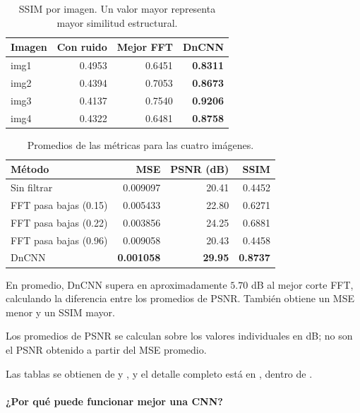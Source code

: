 \documentclass[11pt]{article}
\begin{document}
\begin{table}[H]
\centering

\caption{
    SSIM por imagen. Un valor mayor representa mayor
    similitud estructural.
}
\label{tab:cnn-ssim}

\begin{tabular}{lrrr}
\hline
\rowcolor{pastelblue}
Imagen & Con ruido & Mejor FFT & DnCNN\\
\hline
img1 & 0.4953 & 0.6451 & \textbf{0.8311}\\
img2 & 0.4394 & 0.7053 & \textbf{0.8673}\\
img3 & 0.4137 & 0.7540 & \textbf{0.9206}\\
img4 & 0.4322 & 0.6481 & \textbf{0.8758}\\
\hline
\end{tabular}
\end{table}

\begin{table}[H]
\centering

\caption{Promedios de las métricas para las cuatro imágenes.}
\label{tab:cnn-promedios}

\begin{tabular}{lrrr}
\hline
\rowcolor{pastelblue}
Método & MSE & PSNR (dB) & SSIM\\
\hline
Sin filtrar
    & 0.009097 & 20.41 & 0.4452\\
FFT pasa bajas (0.15)
    & 0.005433 & 22.80 & 0.6271\\
FFT pasa bajas (0.22)
    & 0.003856 & 24.25 & 0.6881\\
FFT pasa bajas (0.96)
    & 0.009058 & 20.43 & 0.4458\\
DnCNN
    & \textbf{0.001058}
    & \textbf{29.95}
    & \textbf{0.8737}\\
\hline
\end{tabular}
\end{table}

En promedio, DnCNN supera en aproximadamente $5.70$ dB al
mejor corte FFT, calculando la diferencia entre los
promedios de PSNR. También obtiene un MSE menor y un
SSIM mayor.

Los promedios de PSNR se calculan sobre los valores
individuales en dB; no son el PSNR obtenido a partir del
MSE promedio.

Las tablas se obtienen de  y
, y el detalle completo está en
, dentro de
.

\paragraph{¿Por qué puede funcionar mejor una CNN?}
\end{document}
